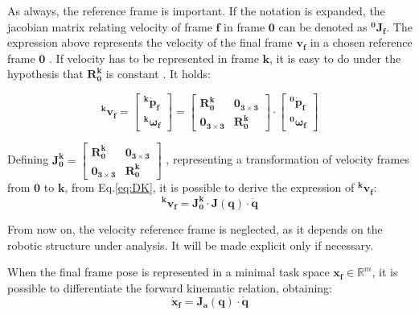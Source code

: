 As always, the reference frame is important.
If the notation is expanded, the jacobian matrix relating velocity of frame $\mathbf{f}$ in frame $\mathbf{0}$ can be denoted as $\mathbf{^0J_f}$.
The expression above represents the velocity of the final frame $\mathbf{v_f}$ in a chosen reference frame $\mathbf{0}$ . If velocity has to be represented in frame $\mathbf{k}$, it is easy to do under the hypothesis that $\mathbf{R^k_0}$ is constant \cite{Siciliano}\cite{CorkeMATLAB}. It holds: 

\begin{equation}
\label{eq:VelocityRelation}
    \mathbf{^k v_f} = \begin{bmatrix}
    \mathbf{^k\dot{p}_f}\\
    \mathbf{^k\omega_f}
    \end{bmatrix} =     \begin{bmatrix}
    \mathbf{R^k_0} & \mathbf{0_{3\times 3}}\\
    \mathbf{0_{3\times 3}} & \mathbf{R^k_0} 
    \end{bmatrix} \cdot    \begin{bmatrix}
    \mathbf{^0\dot{p}_f}\\
    \mathbf{^0\omega_f}
    \end{bmatrix} 
\end{equation}

Defining 
$\mathbf{J^k_0} = \begin{bmatrix}
    \mathbf{R^k_0} & \mathbf{0_{3\times 3}}\\
    \mathbf{0_{3\times 3}} & \mathbf{R^k_0} 
    \end{bmatrix}$
, representing a transformation of velocity frames from $\mathbf{0}$ to $\mathbf{k}$, from Eq.\ref{eq:DK}, it is possible to derive the expression of $\mathbf{^k v_f}$:
\begin{equation}
\label{eq:DKFrames}
    \mathbf{^k v_f} = \mathbf{J^k_0} \cdot \mathbf{J(q)} \cdot \mathbf{\dot{q}}
\end{equation}

From now on, the velocity reference frame is neglected, as it depends on the robotic structure under analysis. It will be made explicit only if necessary. 

When the final frame pose is represented in a minimal task space $\mathbf{x_f} \in \mathbb{R}^m$, it is possible to differentiate the forward kinematic relation, obtaining:
\begin{equation}
\label{eq:DK_analytical}
    \mathbf{\dot{x}_f} = \mathbf{J_a(\mathbf{q})}\cdot\mathbf{\dot{q}} 
\end{equation}

